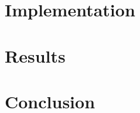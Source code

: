 \documentclass{article} %
\theoremstyle{plain}
\theoremstyle{definition}
\theoremstyle{remark}
\begin{document}
% 

\section{Implementation}\label{sec:implementation}


\section{Results}\label{sec:results}


\section{Conclusion}\label{sec:conclusion}








\appendix


% 





\end{document}
